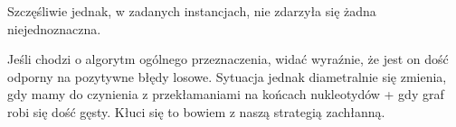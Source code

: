 \documentclass[a4paper]{article}
\begin{document}
Szczęśliwie jednak, w zadanych instancjach, nie zdarzyła się żadna niejednoznaczna.

Jeśli chodzi o algorytm ogólnego przeznaczenia, widać wyraźnie, że jest on dość odporny na pozytywne błędy losowe. Sytuacja
jednak diametralnie się zmienia, gdy mamy do czynienia z przekłamaniami na końcach nukleotydów + gdy graf robi się dość gęsty.
Kłuci się to bowiem z naszą strategią zachłanną.
\end{document}
